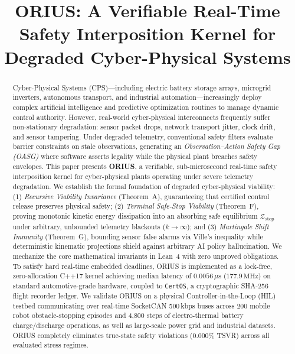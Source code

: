 \documentclass[conference]{IEEEtran}
\begin{document}
\title{ORIUS: A Verifiable Real-Time Safety Interposition Kernel for Degraded Cyber-Physical Systems}

\author{
}

\maketitle

\begin{abstract}
Cyber-Physical Systems (CPS)---including electric battery storage arrays, microgrid inverters, autonomous transport, and industrial automation---increasingly deploy complex artificial intelligence and predictive optimization routines to manage dynamic control authority. However, real-world cyber-physical interconnects frequently suffer non-stationary degradation: sensor packet drops, network transport jitter, clock drift, and sensor tampering. Under degraded telemetry, conventional safety filters evaluate barrier constraints on stale observations, generating an \emph{Observation--Action Safety Gap (OASG)} where software asserts legality while the physical plant breaches safety envelopes. 
This paper presents \textbf{ORIUS}, a verifiable, sub-microsecond real-time safety interposition kernel for cyber-physical plants operating under severe telemetry degradation. We establish the formal foundation of degraded cyber-physical viability: (1) \emph{Recursive Viability Invariance} (Theorem~A), guaranteeing that certified control release preserves physical safety; (2) \emph{Terminal Safe-Stop Viability} (Theorem~F), proving monotonic kinetic energy dissipation into an absorbing safe equilibrium $\mathcal{Z}_{\mathrm{stop}}$ under arbitrary, unbounded telemetry blackouts ($k \to \infty$); and (3) \emph{Martingale Shift Immunity} (Theorem~G), bounding sensor false alarms via Ville's inequality while deterministic kinematic projections shield against arbitrary AI policy hallucination.
We mechanize the core mathematical invariants in Lean~4 with zero unproved obligations. To satisfy hard real-time embedded deadlines, ORIUS is implemented as a lock-free, zero-allocation C++17 kernel achieving median latency of $0.0056\,\mu\text{s}$ ($177.9\,\text{MHz}$) on standard automotive-grade hardware, coupled to \texttt{CertOS}, a cryptographic SHA-256 flight recorder ledger. We validate ORIUS on a physical Controller-in-the-Loop (HIL) testbed communicating over real-time SocketCAN 500\,kbps buses across 200 mobile robot obstacle-stopping episodes and 4,800 steps of electro-thermal battery charge/discharge operations, as well as large-scale power grid and industrial datasets. ORIUS completely eliminates true-state safety violations ($0.000\%$ TSVR) across all evaluated stress regimes.
\end{abstract}
\end{document}
